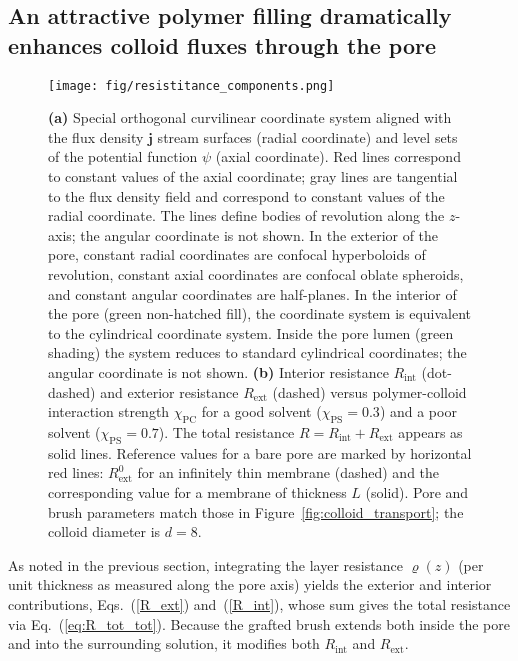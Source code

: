\documentclass[12pt, a4paper]{article}
\begin{document}
\subsection{An attractive polymer filling dramatically enhances colloid fluxes through the pore}

\begin{figure}
    \centering
    \texttt{[image: fig/resistitance\_components.png]}
    \caption{
    \textbf{(a)} 
    Special orthogonal curvilinear coordinate system aligned with the flux density $\bm{j}$ stream surfaces (radial coordinate) and level sets of the potential function $\psi$ (axial coordinate).
    Red lines correspond to constant values of the axial coordinate; gray lines are tangential to the flux density field and correspond to constant values of the radial coordinate.
    The lines define bodies of revolution along the $z$-axis; the angular coordinate is not shown.
    In the exterior of the pore, constant radial coordinates are confocal hyperboloids of revolution, constant axial coordinates are confocal oblate spheroids, and constant angular coordinates are half-planes.
    In the interior of the pore (green non-hatched fill), the coordinate system is equivalent to the cylindrical coordinate system.
    Inside the pore lumen (green shading) the system reduces to standard cylindrical coordinates; the angular coordinate is not shown.  
    \textbf{(b)} Interior resistance $R_{\text{int}}$ (dot-dashed) and exterior resistance $R_{\text{ext}}$ (dashed) versus polymer-colloid interaction strength $\chi_{\text{PC}}$ for a good solvent ($\chi_{\text{PS}} = 0.3$) and a poor solvent ($\chi_{\text{PS}} = 0.7$).  
    The total resistance $R = R_{\text{int}} + R_{\text{ext}}$ appears as solid lines.  
    Reference values for a bare pore are marked by horizontal red lines: $R_{\text{ext}}^{0}$ for an infinitely thin membrane (dashed) and the corresponding value for a membrane of thickness $L$ (solid).  
    Pore and brush parameters match those in Figure~\ref{fig:colloid_transport}; the colloid diameter is $d = 8$.%
    }
    \label{fig:resistivity_profile}
\end{figure}

As noted in the previous section, integrating the layer resistance $\varrho(z)$ (per unit thickness as measured along the pore axis) yields the exterior and interior contributions, Eqs.~(\ref{R_ext}) and~(\ref{R_int}), whose sum gives the total resistance via Eq.~(\ref{eq:R_tot_tot}).  
Because the grafted brush extends both inside the pore and into the surrounding solution, it modifies both $R_{\text{int}}$ and $R_{\text{ext}}$.
\end{document}
